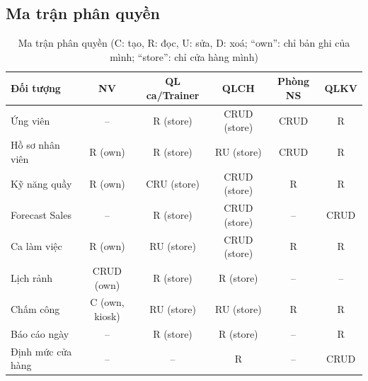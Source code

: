 \documentclass[12pt,a4paper,oneside]{report}
\begin{document}
\subsection{Ma trận phân quyền}
\begin{table}[H]\centering\small
\caption{Ma trận phân quyền (C: tạo, R: đọc, U: sửa, D: xoá; ``own'': chỉ bản ghi của mình; ``store'': chỉ cửa hàng mình)}\label{tab:acl}
\begin{tabular}{lccccc}
\toprule \textbf{Đối tượng} & \textbf{NV} & \textbf{QL ca/Trainer} & \textbf{QLCH} & \textbf{Phòng NS} & \textbf{QLKV} \\\midrule
Ứng viên & – & R (store) & CRUD (store) & CRUD & R \\
Hồ sơ nhân viên & R (own) & R (store) & RU (store) & CRUD & R \\
Kỹ năng quầy & R (own) & CRU (store) & CRUD (store) & R & R \\
Forecast Sales & – & R (store) & CRUD (store) & – & CRUD \\
Ca làm việc & R (own) & RU (store) & CRUD (store) & R & R \\
Lịch rảnh & CRUD (own) & R (store) & R (store) & – & – \\
Chấm công & C (own, kiosk) & RU (store) & RU (store) & R & R \\
Báo cáo ngày & – & R (store) & R (store) & – & R \\
Định mức cửa hàng & – & – & R & – & CRUD \\
\bottomrule
\end{tabular}
\end{table}
\end{document}
